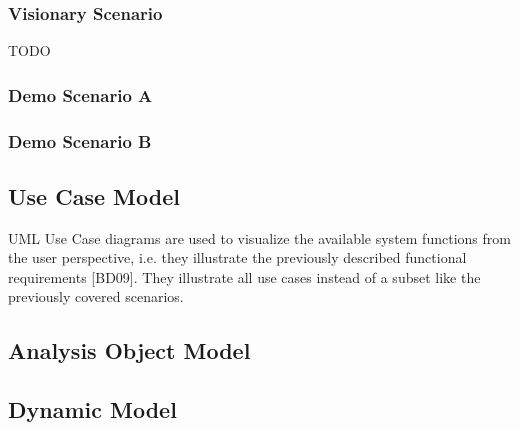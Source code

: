 \subsubsection{Visionary Scenario}
TODO
\subsubsection{Demo Scenario A}

\subsubsection{Demo Scenario B}

\subsection{Use Case Model}
UML Use Case diagrams are used to visualize the available system functions from the user perspective, i.e. they illustrate the previously described functional requirements [BD09].
They illustrate all use cases instead of a subset like the previously covered scenarios.

\subsection{Analysis Object Model}
\subsection{Dynamic Model}
